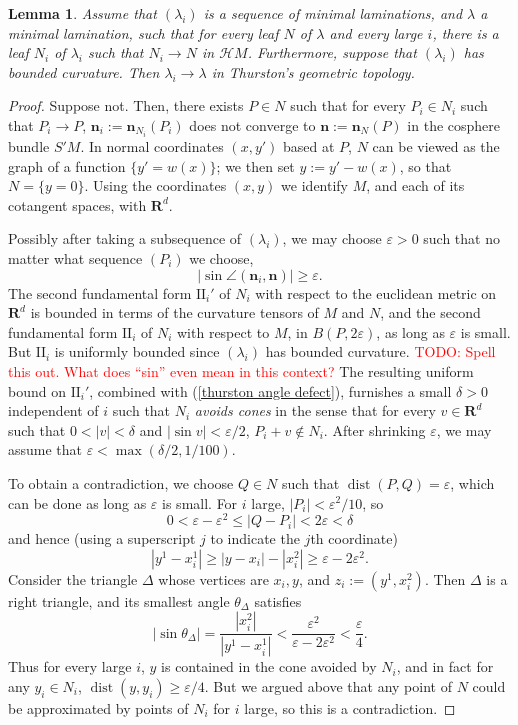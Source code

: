 \documentclass[reqno,11pt]{amsart}
\newcommand{\RR}{\mathbf{R}}
\DeclareMathOperator{\dist}{dist}
\newcommand{\Hypspace}{\mathscr H}
\newcommand{\Two}{\mathrm{I\!I}}
\newcommand{\normal}{\mathbf n}
\newcommand{\dfn}[1]{\emph{#1}\index{#1}}
\newtheorem{lemma}[theorem]{Lemma}
\theoremstyle{definition}
\numberwithin{equation}{section}
\newcommand\todo[1]{\textcolor{red}{TODO: #1}}
\begin{document}
\begin{lemma}\label{convergence of geodesic lams in thurston}
Assume that $(\lambda_i)$ is a sequence of minimal laminations, and $\lambda$ a minimal lamination, such that for every leaf $N$ of $\lambda$ and every large $i$, there is a leaf $N_i$ of $\lambda_i$ such that $N_i \to N$ in $\Hypspace M$.
Furthermore, suppose that $(\lambda_i)$ has bounded curvature.
Then $\lambda_i \to \lambda$ in Thurston's geometric topology.
\end{lemma}
\begin{proof}
Suppose not. Then, there exists $P \in N$ such that for every $P_i \in N_i$ such that $P_i \to P$, $\normal_i := \normal_{N_i}(P_i)$ does not converge to $\normal := \normal_N(P)$ in the cosphere bundle $S'M$.
In normal coordinates $(x, y')$ based at $P$, $N$ can be viewed as the graph of a function $\{y' = w(x)\}$; we then set $y := y' - w(x)$, so that $N = \{y = 0\}$.
Using the coordinates $(x, y)$ we identify $M$, and each of its cotangent spaces, with $\RR^d$.

Possibly after taking a subsequence of $(\lambda_i)$, we may choose $\varepsilon > 0$ such that no matter what sequence $(P_i)$ we choose,
\begin{equation}\label{thurston angle defect}
	|\sin \angle(\normal_i, \normal)| \geq \varepsilon.
\end{equation}
The second fundamental form $\Two_i'$ of $N_i$ with respect to the euclidean metric on $\RR^d$ is bounded in terms of the curvature tensors of $M$ and $N$, and the second fundamental form $\Two_i$ of $N_i$ with respect to $M$, in $B(P, 2\varepsilon)$, as long as $\varepsilon$ is small.
But $\Two_i$ is uniformly bounded since $(\lambda_i)$ has bounded curvature. \todo{Spell this out. What does ``sin'' even mean in this context?}
The resulting uniform bound on $\Two_i'$, combined with (\ref{thurston angle defect}), furnishes a small $\delta > 0$ independent of $i$ such that $N_i$ \dfn{avoids cones} in the sense that for every $v \in \RR^d$ such that $0 < |v| < \delta$ and $|\sin v| < \varepsilon/2$, $P_i + v \notin N_i$.
After shrinking $\varepsilon$, we may assume that $\varepsilon < \max(\delta/2, 1/100)$.

To obtain a contradiction, we choose $Q \in N$ such that $\dist(P, Q) = \varepsilon$, which can be done as long as $\varepsilon$ is small.
For $i$ large, $|P_i| < \varepsilon^2/10$, so
$$0 < \varepsilon - \varepsilon^2 \leq |Q - P_i| < 2\varepsilon < \delta$$
and hence (using a superscript $j$ to indicate the $j$th coordinate)
$$|y^1 - x_i^1| \geq |y - x_i| - |x_i^2| \geq \varepsilon - 2\varepsilon^2.$$
Consider the triangle $\Delta$ whose vertices are $x_i, y$, and $z_i := (y^1, x_i^2)$.
Then $\Delta$ is a right triangle, and its smallest angle $\theta_\Delta$ satisfies
$$|\sin \theta_\Delta| = \frac{|x_i^2|}{|y^1 - x_i^1|} < \frac{\varepsilon^2}{\varepsilon - 2\varepsilon^2} < \frac{\varepsilon}{4}.$$
Thus for every large $i$, $y$ is contained in the cone avoided by $N_i$, and in fact for any $y_i \in N_i$, $\dist(y, y_i) \geq \varepsilon/4$.
But we argued above that any point of $N$ could be approximated by points of $N_i$ for $i$ large, so this is a contradiction.
\end{proof}
\end{document}
